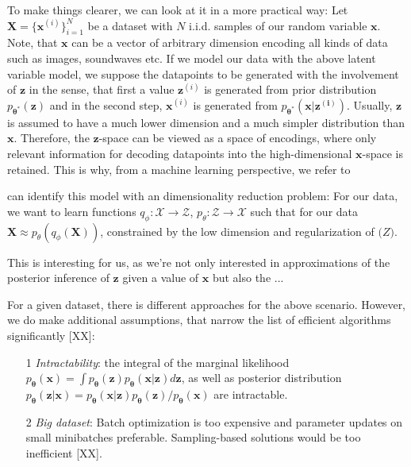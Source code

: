 \documentclass[12pt]{report}
\theoremstyle{definition}
\begin{document}
To make things clearer, we can  look at it in a more practical way: Let $\mathbf{X} = \{ \mathbf{x}^{(i)}\}_{i=1}^N$ be a dataset with $N$ i.i.d. samples of our random variable $\mathbf{x}$. Note, that $\mathbf{x}$ can be a vector of arbitrary dimension encoding all kinds of data such as images, soundwaves etc. If we model our data with the above latent variable model, we suppose the datapoints to be generated with the involvement of $\mathbf{z}$ in the sense, that first a value $\mathbf{z}^{(i)}$ is generated from prior distribution $p_{\mathbf{\theta^*}}(\mathbf{z})$ and in the second step, $\mathbf{x}^{(i)}$ is generated from $p_{\mathbf{\theta^*}}(\mathbf{x}|\mathbf{z^{(i)}})$. 
Usually, $\mathbf{z}$ is assumed to have a much lower dimension and a much simpler distribution than $\mathbf{x}$. Therefore, the $\mathbf{z}$-space can be viewed as a space of encodings, where only relevant information for decoding datapoints into the high-dimensional $\mathbf{x}$-space is retained. This is why, from a machine learning perspective, we refer to 

can identify this model with an dimensionality reduction problem: For our data, we want to learn functions $q_{\phi}: \mathcal{X} \rightarrow \mathcal{Z}$, $p_{\theta}: \mathcal{Z} \rightarrow \mathcal{X}$ such that for our data $\mathbf{X} \approx p_{\theta}(q_{\phi}(\mathbf{X}))$, constrained by the low dimension and regularization of $\mathcal(Z)$. 

This is interesting for us, as we're not only interested in approximations of the posterior inference of $\mathbf{z}$ given a value of $\mathbf{x}$ but also the ... %

For a given dataset, there is different approaches for the above scenario. However, we do make additional assumptions, that narrow the list of efficient algorithms significantly [XX]:

\begin{itemize}
	\item[1] \emph{Intractability}: the integral of the marginal likelihood $p_{\mathbf{\theta}}(\mathbf{x}) = \int p_{\mathbf{\theta}}(\mathbf{z}) p_{\mathbf{\theta}}(\mathbf{x}|\mathbf{z}) d \mathbf{z}$, as well as posterior distribution $p_{\mathbf{\theta}}(\mathbf{z}|\mathbf{x}) = p_{\mathbf{\theta}}(\mathbf{x}|\mathbf{z}) p_{\mathbf{\theta}}(\mathbf{z}) / p_{\mathbf{\theta}}(\mathbf{x})$ are intractable.
	\item[2] \emph{Big dataset}: Batch optimization is too expensive and parameter updates on small minibatches preferable. Sampling-based solutions would be too inefficient [XX].
\end{itemize}
\end{document}
